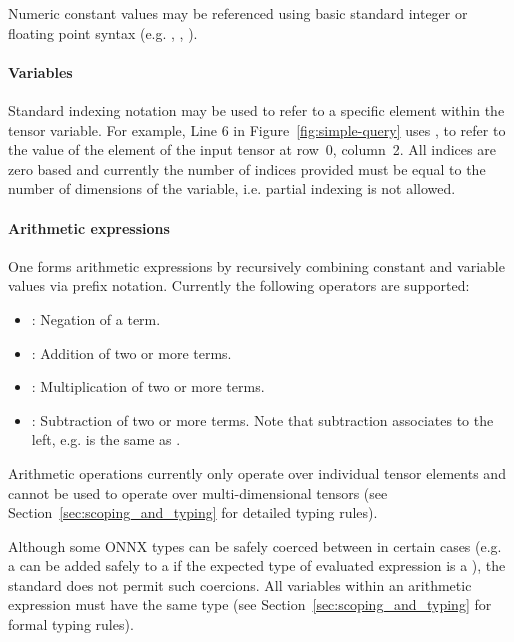 Numeric constant values may be referenced using basic standard integer or floating point syntax (e.g. , , ). 

\paragraph{Variables} 

Standard indexing notation may be used to refer to a specific element within the tensor variable. For example, Line 6 in Figure~\ref{fig:simple-query} uses , to refer to the value of the element of the input tensor at row~0, column~2. All indices are zero based and currently the number of indices provided must be equal to the number of dimensions of the variable, i.e. partial indexing is not allowed.

\paragraph{Arithmetic expressions}

One forms arithmetic expressions by recursively combining constant and variable values via prefix notation. Currently the following operators are supported:
\begin{itemize}
	\item {}: Negation of a term.
    \item {}: Addition of two or more terms. 
    \item {}: Multiplication of two or more terms. 
    \item {}: Subtraction of two or more terms. Note that subtraction associates to the left, e.g.  is the same as  .
\end{itemize}
Arithmetic operations currently only operate over individual tensor elements and cannot be used to operate over multi-dimensional tensors (see Section~\ref{sec:scoping_and_typing} for detailed typing rules). 

Although some ONNX types can be safely coerced between in certain cases (e.g. a  can be added safely to a  if the expected type of evaluated expression is a ), the \vnnlib{} standard does not permit such coercions.
All variables within an arithmetic expression must have the same type (see Section~\ref{sec:scoping_and_typing} for formal typing rules). 

